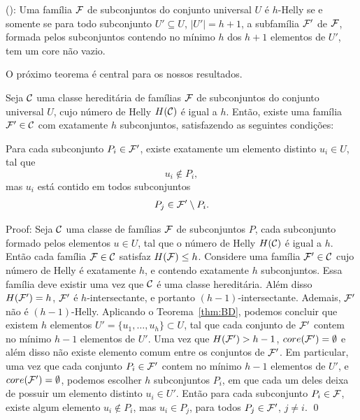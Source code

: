 \begin{theorem}\label{thm:BD}(\cite{bergeDuchet1975}):
Uma família $\cal{F}$ de subconjuntos do conjunto universal  $U$ é $h$-Helly se e somente se para todo subconjunto   $U' \subseteq U$, $|U'|= h+1$,  a subfamília  $\cal{F'}$ de $\cal{F}$,  formada pelos subconjuntos contendo no mínimo  $h$ dos $h+1$ elementos de $U'$, tem um core não vazio. 
\end{theorem}

O próximo teorema é central para os nossos resultados.

\begin{theorem}\label{thm:minimal}Seja ${\cal C}$ uma classe hereditária de famílias ${\cal F}$ de subconjuntos do conjunto universal $U$, cujo número de Helly $H({\cal C})$ é igual a $h$. Então, existe uma família ${\cal F'} \in {\cal C}$ com exatamente $h$ subconjuntos, satisfazendo as seguintes condições: 

Para cada subconjunto  $P_i \in \cal {F'}$, existe exatamente um elemento distinto $u_i \in U$, tal que \\
$$u_i \not \in P_i,$$ 
mas $u_i$ está contido em todos subconjuntos 
$$P_j \in {\cal F'} \setminus P_i.$$
\end{theorem}
 

Proof: 
Seja ${\cal C}$ uma classe de famílias  ${\cal F}$ de subconjuntos $P$, cada subconjunto formado pelos elementos  $u \in U$, tal que o número de Helly $H({\cal C})$  é igual a $h$. Então cada família   ${\cal F} \in {\cal C}$ satisfaz $H({\cal F}) \leq h$. Considere uma família ${\cal F'} \in {\cal C}$  cujo número de Helly é  exatamente $h$, e contendo exatamente $h$ subconjuntos. Essa família deve existir uma vez que  ${\cal C}$ é uma classe hereditária. Além disso $H({\cal F'}) = h$, $\cal F'$ é $h$-intersectante, e portanto $(h-1)$-intersectante. Ademais, ${\cal F'}$ não é $(h-1)$-Helly. Aplicando o   Teorema~\ref{thm:BD}, podemos concluir que existem   $h$ elementos $U' = \{u_1, \ldots, u_h\} \subset U$, tal que cada conjunto de ${\cal F'}$ contem no mínimo $h-1$ elementos de $U'$. Uma vez que $H({\cal F'}) > h-1$, $core({\cal F'}) = \emptyset$ e além disso não existe elemento comum entre os conjuntos de $\cal F'$. Em particular, uma vez que cada conjunto $P_i \in {\cal F'}$ contem no mínimo  $h-1$ elementos de $U'$, e $core(\cal F') = \emptyset$, podemos escolher   $h$ subconjuntos $P_i$, em que cada um deles deixa de possuir um elemento distinto  $u_i \in U'$. Então para cada subconjunto  $P_i \in \cal F$, existe algum elemento $u_i \not \in P_i$, mas $u_i \in P_j$, para todos $P_j \in \cal F'$, $j \neq i$. \qed

